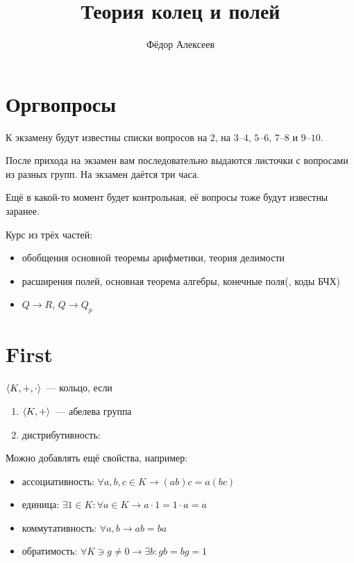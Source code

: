 



\title{Теория колец и полей}
\author{Фёдор Алексеев}

\maketitle
\gitlink{}
\tableofcontents\newpage{}

\section*{Оргвопросы}
\label{sec:organization}
К экзамену будут известны списки вопросов на $2$, на $3$--$4$, $5$--$6$, $7$--$8$ и $9$--$10$.

После прихода на экзамен вам последовательно выдаются листочки с вопросами из разных групп.
На экзамен даётся три часа.

Ещё в какой-то момент будет контрольная, её вопросы тоже будут известны заранее.

Курс из трёх частей:
\begin{itemize}
  \item обобщения основной теоремы арифметики, теория делимости
  \item расширения полей, основная теорема алгебры, конечные поля(, коды БЧХ)
  \item $Q \to R$, $Q \to Q_p$
\end{itemize}

\section{First}
\label{sec:first}

\begin{define*}
  $\braket{K, +, \cdot}$~--- кольцо, если 
  \begin{enumerate}
    \item $\braket{K,+}$~--- абелева группа
    \item дистрибутивность:
  \end{enumerate}
\end{define*}

Можно добавлять ещё свойства, например:
\begin{itemize}
  \item ассоциативность: $\forall a,b,c \in K \to (ab)c = a(bc)$
  \item единица: $\exists 1 \in K : \forall a \in K \to a\cdot 1 = 1 \cdot a = a$
  \item коммутативность: $\forall a, b \to ab=ba$
  \item обратимость: $\forall K \ni g\ne 0 \to \exists b : gb = bg = 1$
\end{itemize}

